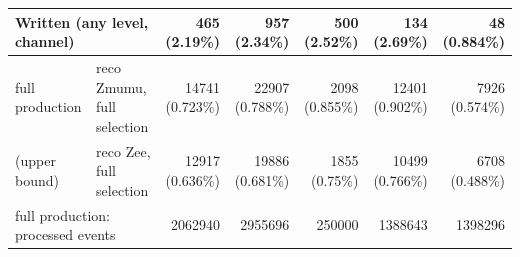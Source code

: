 \begin{tabular}{llrrrrr}
\midrule
\multicolumn{2}{l}{Written (any level, channel)} & 465 (2.19\%) & 957 (2.34\%) & 500 (2.52\%) & 134 (2.69\%) & 48 (0.884\%) \\
\midrule
full production & reco Zmumu, full selection & 14741 (0.723\%) & 22907 (0.788\%) & 2098 (0.855\%) & 12401 (0.902\%) & 7926 (0.574\%) \\
(upper bound) & reco Zee, full selection & 12917 (0.636\%) & 19886 (0.681\%) & 1855 (0.75\%) & 10499 (0.766\%) & 6708 (0.488\%) \\
\multicolumn{2}{l}{full production: processed events} & 2062940 & 2955696 & 250000 & 1388643 & 1398296 \\
\bottomrule
\end{tabular}
